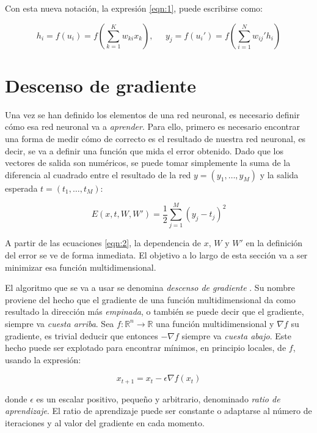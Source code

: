 Con esta nueva notación, la expresión \ref{eqn:1}, puede escribirse como:

\begin{equation}
    \label{eqn:2}
    h_i = f(u_i) = f\left(\sum_{k=1}^K w_{ki} x_k\right), \;\;\;\;\;
    y_j = f(u_i') = f\left(\sum_{i=1}^N w_{ij}' h_i\right)
\end{equation}

\section{Descenso de gradiente}

Una vez se han definido los elementos de una red neuronal, es necesario definir cómo esa red neuronal
va a \textit{aprender}. Para ello, primero es necesario encontrar una forma de medir cómo de correcto
es el resultado de nuestra red neuronal, es decir, se va a definir una función que mida el error obtenido.
Dado que los vectores de salida son numéricos, se puede tomar simplemente la suma de la diferencia al
cuadrado entre el resultado de la red $y = (y_1, \ldots, y_M)$ y la salida esperada $t = (t_1, \ldots, t_M)$:

\begin{equation}
    \label{eqn:3}
    E(x, t, W, W') = \frac{1}{2}\sum_{j=1}^M(y_j-t_j)^2
\end{equation}

A partir de las ecuaciones \ref{eqn:2}, la dependencia de $x$, $W$ y $W'$ en la definición del error se
ve de forma inmediata. El objetivo a lo largo de esta sección va a ser minimizar esa función multidimensional.

El algoritmo que se va a usar se denomina \textit{descenso de gradiente} \cite{lemarechal2012cauchy}.
Su nombre proviene del hecho
que el gradiente de una función multidimensional da como resultado la dirección más \textit{empinada},
o también se puede decir que el gradiente, siempre va \textit{cuesta arriba}. Sea $f \colon \mathbb{R}^n \longrightarrow \mathbb{R}$
una función multidimensional y $\nabla f$ su gradiente, es trivial deducir que entonces $-\nabla f$
siempre va \textit{cuesta abajo}. Este hecho puede ser explotado para encontrar mínimos, en principio locales,
de $f$, usando la expresión:

\begin{equation}
    \label{eqn:gradient_descent}
    x_{t+1}=x_t-\epsilon\nabla f(x_t)
\end{equation}

donde $\epsilon$ es un escalar positivo, pequeño y arbitrario, denominado \textit{ratio de aprendizaje}.
El ratio de aprendizaje puede ser constante o adaptarse al número de iteraciones y al valor del gradiente en cada momento.

